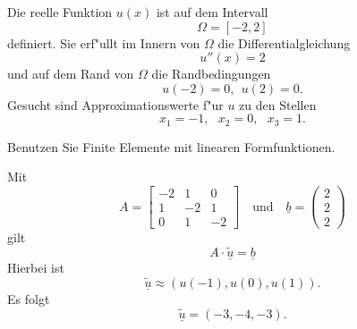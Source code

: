 Die reelle Funktion $u(x)$ ist auf dem Intervall
\[
\Omega = [-2, 2]
\]
definiert. Sie erf"ullt im Innern von $\Omega$ die Differentialgleichung 
\[
u''(x) = 2
\]
und auf dem Rand von $\Omega$ die Randbedingungen 
\[
u(-2) = 0, \ \ u(2) = 0.
\]
Gesucht sind Approximationswerte f"ur $u$ zu den Stellen
\[
x_1 = -1, \ \ \ x_2 = 0, \ \ \  x_3 = 1.
\]

Benutzen Sie Finite Elemente mit linearen Formfunktionen.

\begin{loesung}
Mit
\[
A
=
\left[\begin{array}{rrr} -2 & 1 & 0 \\ 1 & -2 & 1 \\ 0 & 1 & -2  \end{array}\right]
\quad\mbox{und}\quad
\underline{b} =  \left(\begin{array}{r} 2 \\ 2 \\ 2 \end{array}\right)
\]
gilt  
\[
A \cdot \underline{\tilde u} = \underline{b}
\]
Hierbei ist
\[
\underline{\tilde u} \approx (u(-1), u(0), u(1)).
\]
Es folgt 
\[
\underline{\tilde u} = (-3,-4,-3).
\]
\end{loesung}

